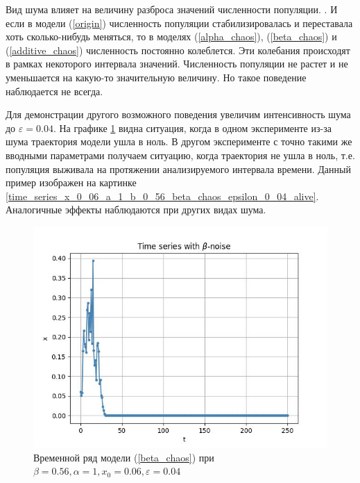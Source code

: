     Вид шума влияет на величину разброса значений численности популяции. . И если в модели (\ref{origin}) численность популяции стабилизировалась и переставала хоть сколько-нибудь меняться, то в моделях (\ref{alpha_chaos}), (\ref{beta_chaos}) и (\ref{additive_chaos}) численность постоянно колеблется. Эти колебания происходят в рамках некоторого интервала значений. Численность популяции не растет и не уменьшается на какую-то значительную величину. Но такое поведение наблюдается не всегда.


    Для демонстрации другого возможного поведения увеличим интенсивность шума до \(\varepsilon = 0.04\). На графике \ref{time_series_x_0_06_a_1_b_0_56_beta_chaos_epsilon_0_04_fall} видна ситуация, когда в одном эксперименте из-за шума траектория модели ушла в ноль. В другом эксперименте с точно такими же вводными параметрами получаем ситуацию, когда траектория не ушла в ноль, т.е. популяция выживала на протяжении анализируемого интервала времени. Данный пример изображен на картинке \ref{time_series_x_0_06_a_1_b_0_56_beta_chaos_epsilon_0_04_alive}. Аналогичные эффекты наблюдаются при других видах шума.

    \begin{figure}
        \centering
        \includegraphics[width=\textwidth]{stochastic/images/time_series_x_0_06_a_1_b_0_56_beta_chaos_epsilon_0_04_fall.jpg}
        
        \captionsetup{justification=centering}
        \caption{Временной ряд модели (\ref{beta_chaos}) при \(\beta = 0.56, \alpha = 1, x_0 = 0.06, \varepsilon = 0.04\)}
        \label{time_series_x_0_06_a_1_b_0_56_beta_chaos_epsilon_0_04_fall}
    \end{figure}

